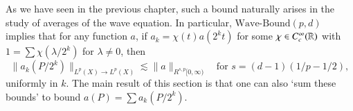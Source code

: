 As we have seen in the previous chapter, such a bound naturally arises in the study of averages of the wave equation. In particular, $\text{Wave-Bound}(p,d)$ implies that for any function $a$, if $a_k = \chi(t) a(2^k t)$ for some $\chi \in C_c^\infty(\operatorname{\mathbb{R}})$ with $1 = \sum \chi(\lambda/2^k)$ for $\lambda \neq 0$, then
%
\begin{equation}
    \| a_k(P/2^k) \|_{L^p(X) \to L^p(X)} \lesssim \| a \|_{R^{s,p}[0,\infty)} \quad\text{for $s = (d-1)(1/p - 1/2)$},
\end{equation}
%
uniformly in $k$. The main result of this section is that one can also `sum these bounds' to bound $a(P) = \sum a_k(P/2^k)$.

\thmatomicscalestheorem*


